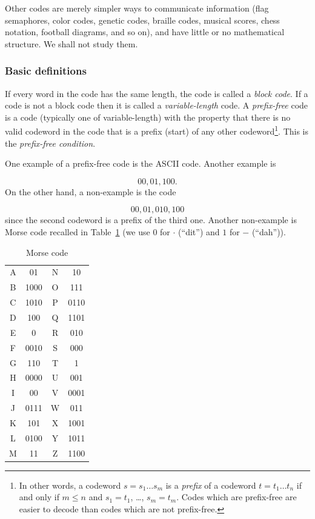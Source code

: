 Other codes are merely simpler ways to communicate information
(flag semaphores, color codes, genetic codes, braille codes, musical scores, chess
notation, football diagrams, and so on), and have little or no
mathematical structure. We shall not study them.



\subsubsection{Basic definitions}

If every word in the code has the same length, the code is called
a {\it block code}. If a code is not a block code then it is called
a {\it variable-length} code.
A {\it prefix-free} code is a code (typically one of variable-length)
with the property that there is no valid codeword in the code that
is a prefix (start) of any other codeword\footnote{In other words,
a codeword $s=s_1 \dots s_m$ is a {\it prefix} of a codeword
$t=t_1\dots t_n$ if and only if $m\leq n$ and
$s_1=t_1$, \dots, $s_m=t_m$. Codes which are prefix-free are easier
to decode than codes which are not prefix-free.}.
This is the {\it prefix-free condition}.

One example of a prefix-free code is the ASCII code.
Another example is

\[
00, 01, 100.
\]
On the other hand, a non-example is the code

\[
00, 01, 010, 100
\]
since the second codeword is a prefix of the third one.
Another non-example is Morse code recalled in
Table~\ref{tab:trees_forests:Morse_code} (we use $0$ for
$\cdot$ (``dit'') and $1$ for $-$ (``dah'')).

\begin{table}[!htbp]
\centering
\begin{tabular}{|c|c||c|c|} \hline
A & 01    & N & 10 \\
B & 1000  & O & 111 \\
C & 1010  & P & 0110 \\
D & 100   & Q & 1101 \\
E & 0     & R & 010 \\
F & 0010  & S & 000 \\
G & 110   & T & 1 \\
H & 0000  & U & 001 \\
I & 00    & V & 0001 \\
J & 0111  & W & 011 \\
K & 101   & X & 1001 \\
L & 0100  & Y & 1011 \\
M & 11    & Z & 1100 \\\hline
\end{tabular}
\caption{Morse code}
\label{tab:trees_forests:Morse_code}
\end{table}

